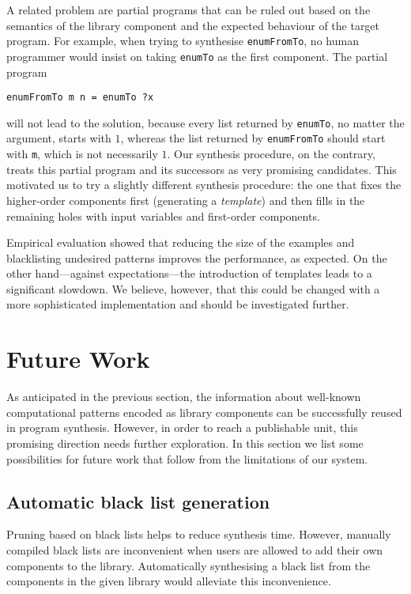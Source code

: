 A related problem are partial programs that can be ruled out based on the semantics of the library component and the expected behaviour of the target program. For example, when trying to synthesise \lstinline!enumFromTo!, no human programmer would insist on taking \lstinline!enumTo! as the first component. The partial program
\begin{lstlisting}[style=plain]
enumFromTo m n = enumTo ?x
\end{lstlisting}
will not lead to the solution, because every list returned by \lstinline!enumTo!, no matter the argument, starts with $1$, whereas the list returned by \lstinline!enumFromTo! should start with \lstinline!m!, which is not necessarily $1$. Our synthesis procedure, on the contrary, treats this partial program and its successors as very promising candidates.
This motivated us to try a slightly different synthesis procedure: the one that fixes the higher-order components first (generating a \emph{template}) and then fills in the remaining holes with input variables and first-order components.

Empirical evaluation showed that reducing the size of the examples and blacklisting undesired patterns improves the performance, as expected. On the other hand---against expectations---the introduction of templates leads to a significant slowdown. We believe, however, that this could be changed with a more sophisticated implementation and should be investigated further.


\section{Future Work}

As anticipated in the previous section, the information about well-known computational patterns encoded as library components can be successfully reused in program synthesis. However, in order to reach a publishable unit, this promising direction needs further exploration. In this section we list some possibilities for future work that follow from the limitations of our system.

\subsection{Automatic black list generation}
Pruning based on black lists helps to reduce synthesis time. However, manually compiled black lists are inconvenient when users are allowed to add their own components to the library. Automatically synthesising a black list from the components in the given library would alleviate this inconvenience.

